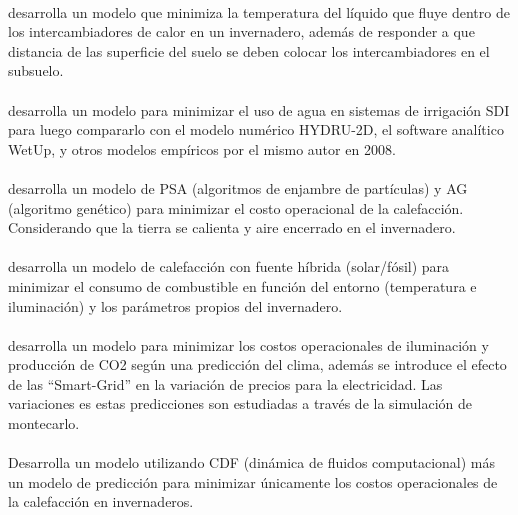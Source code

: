 \documentclass[12pt,a4paper]{article}
\begin{document}
	{
	\paragraph{\cite{Kurpaska2000}}	 desarrolla un modelo que minimiza la temperatura del líquido que fluye dentro de los intercambiadores de calor en un invernadero, además de responder a que distancia de las superficie del suelo se deben colocar los intercambiadores en el subsuelo.
		
	\paragraph{\cite{Kandelous2010}} desarrolla un modelo para minimizar el uso de agua en sistemas de irrigación SDI para luego compararlo con el modelo numérico HYDRU-2D, el software analítico WetUp, y otros modelos empíricos por el mismo autor en 2008.
		
	\paragraph{\cite{Hasni2011}} desarrolla un modelo de PSA (algoritmos de enjambre de partículas) y AG (algoritmo genético) para minimizar el costo operacional de la calefacción. Considerando que la tierra se calienta y aire encerrado en el invernadero. 


	\paragraph{\cite{Kiyan2013}} desarrolla un modelo de calefacción con fuente híbrida (solar/fósil) para minimizar el consumo de combustible en función del entorno (temperatura e iluminación) y los parámetros propios del invernadero.
		
		
	\paragraph{\cite{Bozchalui2015}}desarrolla un modelo para minimizar los costos operacionales de iluminación y producción de CO2 según una predicción del clima, además se introduce el efecto de las ``Smart-Grid'' en la variación de precios para la electricidad. Las variaciones es estas predicciones son estudiadas a través de la simulación de montecarlo.


	\paragraph{\cite{Chen2015}} Desarrolla un modelo utilizando CDF (dinámica de fluidos computacional) más un modelo de predicción para minimizar únicamente los costos operacionales de la calefacción en invernaderos.

}
\end{document}
